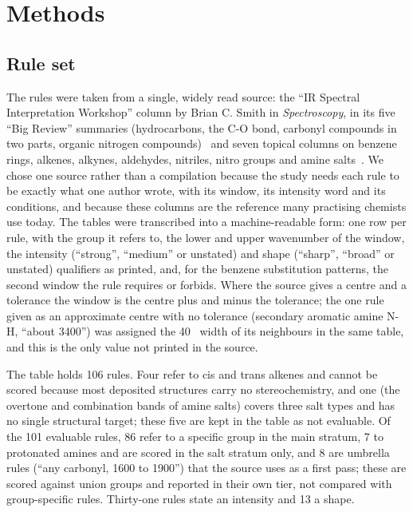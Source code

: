 \section{Methods}
\label{sec:methods}

\subsection{Rule set}
\label{sec:rules}

The rules were taken from a single, widely read source: the ``IR Spectral Interpretation Workshop'' column by Brian C. Smith in \emph{Spectroscopy}, in its five ``Big Review'' summaries (hydrocarbons, the C-O bond, carbonyl compounds in two parts, organic nitrogen compounds)~\cite{smith2025bigreview4,smith2025bigreview5,smith2025bigreview6,smith2025bigreview7,smith2026bigreview8} and seven topical columns on benzene rings, alkenes, alkynes, aldehydes, nitriles, nitro groups and amine salts~\cite{smith2016benzene,smith2016alkenes,smith2017alkynes,smith2017aldehydes,smith2019nitriles,smith2020nitro,smith2019aminesalts}. We chose one source rather than a compilation because the study needs each rule to be exactly what one author wrote, with its window, its intensity word and its conditions, and because these columns are the reference many practising chemists use today. The tables were transcribed into a machine-readable form: one row per rule, with the group it refers to, the lower and upper wavenumber of the window, the intensity (``strong'', ``medium'' or unstated) and shape (``sharp'', ``broad'' or unstated) qualifiers as printed, and, for the benzene substitution patterns, the second window the rule requires or forbids. Where the source gives a centre and a tolerance the window is the centre plus and minus the tolerance; the one rule given as an approximate centre with no tolerance (secondary aromatic amine N-H, ``about 3400'') was assigned the 40~\wn{} width of its neighbours in the same table, and this is the only value not printed in the source.

The table holds 106 rules. Four refer to cis and trans alkenes and cannot be scored because most deposited structures carry no stereochemistry, and one (the overtone and combination bands of amine salts) covers three salt types and has no single structural target; these five are kept in the table as not evaluable. Of the 101 evaluable rules, 86 refer to a specific group in the main stratum, 7 to protonated amines and are scored in the salt stratum only, and 8 are umbrella rules (``any carbonyl, 1600 to 1900'') that the source uses as a first pass; these are scored against union groups and reported in their own tier, not compared with group-specific rules. Thirty-one rules state an intensity and 13 a shape.

